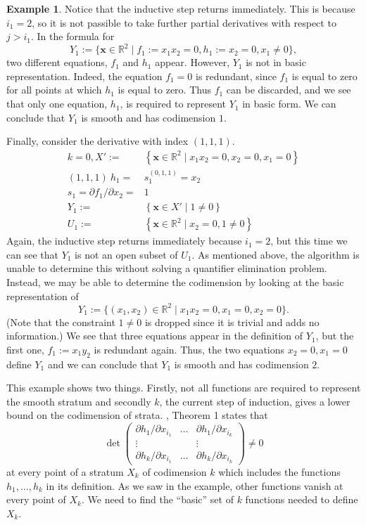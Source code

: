 \documentclass[
]{book}
\theoremstyle{definition}
\theoremstyle{definition}
\newtheorem{example}{Example}[chapter]
\theoremstyle{definition}
\theoremstyle{definition}
\theoremstyle{remark}
\begin{document}
\begin{example}
Notice that the inductive step returns immediately. This is because \(i_1=2\), so it is not passible to take further partial derivatives with respect to \(j > i_1\). In the formula for
\[
Y_1 := \{ \mathbf{x} \in \mathbb{R}^2 \mid f_1 := x_1 x_2 = 0, h_1 := x_2 = 0, x_1 \ne 0 \},
\]
two different equations, \(f_1\) and \(h_1\) appear. However, \(Y_1\) is not in basic representation. Indeed, the equation \(f_1=0\) is redundant, since \(f_1\) is equal to zero for all points at which \(h_1\) is equal to zero. Thus \(f_1\) can be discarded, and we see that only one equation, \(h_1\), is required to represent \(Y_1\) in basic form. We can conclude that \(Y_1\) is smooth and has codimension \(1\).

Finally, consider the derivative with index \((1,1,1)\).
\begin{align*}
k=0,X':=&\left\{ \mathbf{x}\in\mathbb{R}^{2}\mid x_{1}x_{2}=0,x_{2}=0,x_{1}=0\right\} \\\left(1,1,1\right)\ h_{1}=&s_{1}^{\left(0,1,1\right)}=x_{2}\\s_{1}=\partial f_{1}/\partial x_{2}=&1\\Y_{1}:=&\left\{ \mathbf{x}\in X'\mid1\ne0\right\} \\U_{1}:=&\left\{ \mathbf{x}\in\mathbb{R}^{2}\mid x_{2}=0,1\ne0\right\}
\end{align*}
Again, the inductive step returns immediately because \(i_1=2\), but this time we can see that \(Y_1\) is not an open subset of \(U_1\). As mentioned above, the algorithm is unable to determine this without solving a quantifier elimination problem. Instead, we may be able to determine the codimension by looking at the basic representation of \[
Y_1 := \{ (x_1,x_2) \in \mathbb{R}^2 \mid x_1 x_2 = 0, x_1 = 0, x_2 = 0 \}.
\]
(Note that the constraint \(1 \ne 0\) is dropped since it is trivial and adds no information.)
We see that three equations appear in the definition of \(Y_1\), but the first one, \(f_1 := x_1 y_2\) is redundant again. Thus, the two equations \(x_2 = 0, x_1 = 0\) define \(Y_1\) and we can conclude that \(Y_1\) is smooth and has codimension \(2\).
\end{example}

This example shows two things. Firstly, not all functions are required to represent the smooth stratum and secondly \(k\), the current step of induction, gives a lower bound on the codimension of strata.
\citet{gv1995}, Theorem 1 states that
\[
\det\begin{pmatrix}\partial h_{1}/\partial x_{i_{1}} & \ldots & \partial h_{1}/\partial x_{i_{k}}\\
\vdots &  & \vdots\\
\partial h_{k}/\partial x_{i_{1}} & \ldots & \partial h_{k}/\partial x_{i_{k}}
\end{pmatrix}\ne0
\]
at every point of a stratum \(X_k\) of codimension \(k\) which includes the functions \(h_1,\ldots,h_k\) in its definition.
As we saw in the example, other functions vanish at every point of \(X_k\). We need to find the ``basic'' set of \(k\) functions needed to define \(X_k\).
\end{document}
